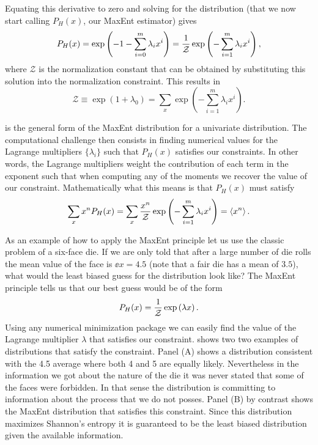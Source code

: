 Equating this derivative to zero and solving for the distribution (that we now
start calling $P_H(x)$, our MaxEnt estimator) gives
\begin{equation}
  P_H(x) = \exp \left(- 1 - \sum_{i=0}^m \lambda_i x^i \right)
         ={1 \over \mathcal{Z}}
         \exp \left( - \sum_{i=1}^m \lambda_i x^i \right),
  \label{eq_maxEnt}
\end{equation}
where $\mathcal{Z}$ is the normalization constant that can be obtained by
substituting this solution into the normalization constraint. This results in
\begin{equation}
  \mathcal{Z} \equiv \exp\left( 1 + \lambda_0 \right) =
  \sum_x \exp \left( - \sum_{i=1}^m \lambda_i x^i \right).
\end{equation}

 is the general form of the MaxEnt distribution for a
univariate distribution. The computational challenge then consists in finding
numerical values for the Lagrange multipliers $\{ \lambda_i \}$ such that
$P_H(x)$ satisfies our constraints. In other words, the Lagrange multipliers
weight the contribution of each term in the exponent such that when computing
any of the moments we recover the value of our constraint. Mathematically what
this means is that $P_H(x)$ must satisfy
\begin{equation}
  \sum_x x^n P_H(x) =
  \sum_x {x^n \over \mathcal{Z}}
  \exp \left( - \sum_{i=1}^m \lambda_i x^i \right) = \left\langle x^n \right\rangle.
\end{equation}

As an example of how to apply the MaxEnt principle let us use the classic
problem of a six-face die. If we are only told that after a large number of die
rolls the mean value of the face is $\ee{x} = 4.5$ (note that a fair die has a
mean of $3.5$), what would the least biased guess for the distribution look
like? The MaxEnt principle tells us that our best guess would be of the form
\begin{equation}
  P_H(x) = {1 \over \mathcal{Z}} \exp \left( \lambda x \right).
\end{equation}
Using any numerical minimization package we can easily find the value of the
Lagrange multiplier $\lambda$  that satisfies our constraint.
 shows two two examples of distributions that satisfy the
constraint. Panel (A) shows a distribution consistent with the 4.5 average
where both 4 and 5 are equally likely. Nevertheless in the information we got
about the nature of the die it was never stated that some of the faces were
forbidden. In that sense the distribution is committing to information about
the process that we do not posses. Panel (B) by contrast shows the MaxEnt
distribution that satisfies this constraint. Since this distribution maximizes
Shannon's entropy it is guaranteed to be the least biased distribution given
the available information.

